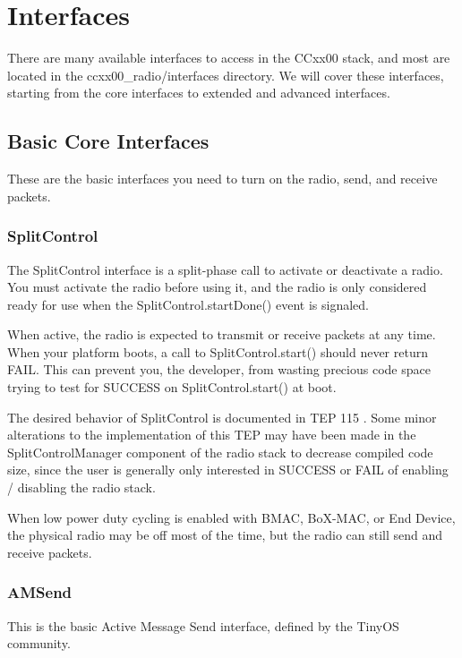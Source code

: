 \documentclass{article}
\begin{document}
\section{Interfaces}
\label{sec:interfaces}
There are many available interfaces to access in the CCxx00 stack, and most are 
located in the ccxx00\_radio/interfaces directory.  We will cover
these interfaces, starting from the core interfaces to extended and advanced interfaces.

\subsection{Basic Core Interfaces}
\label{sec:coreinterfaces}
These are the basic interfaces you need to turn on the radio, send, and receive packets.

\subsubsection{SplitControl}
The SplitControl interface is a split-phase call to activate or deactivate a radio.
You must activate the radio before using it, and the radio is only considered ready for
use when the SplitControl.startDone() event is signaled.

When active, the radio is expected to transmit or receive packets at any time. 
When your platform boots, a call to SplitControl.start() should never return FAIL.  
This can prevent you, the developer, from wasting precious code space trying to test 
for SUCCESS on SplitControl.start() at boot.

The desired behavior of SplitControl is documented in TEP 115 \cite{tep115}. Some minor alterations
to the implementation of this TEP may have been made in the SplitControlManager component
of the radio stack to decrease compiled code size, since the user is generally only interested
in SUCCESS or FAIL of enabling / disabling the radio stack. 

When low power duty cycling is enabled with BMAC, BoX-MAC, or End Device, the physical 
radio may be off most of the time, but the radio can still send and receive packets.

\subsubsection{AMSend}
This is the basic Active Message Send interface, defined by the TinyOS community.
\end{document}
